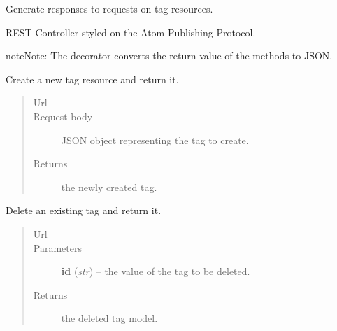 \documentclass[letterpaper,10pt,english]{sphinxmanual}
\begin{document}
\begin{fulllineitems}
\label{api:onlinelinguisticdatabase.controllers.tags.TagsController}
Generate responses to requests on tag resources.

REST Controller styled on the Atom Publishing Protocol.

\begin{notice}{note}{Note:}
The  decorator converts the return value of the methods to
JSON.
\end{notice}

\begin{fulllineitems}
\label{api:onlinelinguisticdatabase.controllers.tags.TagsController.create}
Create a new tag resource and return it.
\begin{quote}\begin{description}
\item[{Url }] \leavevmode
{}

\item[{Request body}] \leavevmode
JSON object representing the tag to create.

\item[{Returns}] \leavevmode
the newly created tag.

\end{description}\end{quote}

\end{fulllineitems}


\begin{fulllineitems}
\label{api:onlinelinguisticdatabase.controllers.tags.TagsController.delete}
Delete an existing tag and return it.
\begin{quote}\begin{description}
\item[{Url }] \leavevmode
{}

\item[{Parameters}] \leavevmode
\textbf{id} (\emph{str}) -- the  value of the tag to be deleted.

\item[{Returns}] \leavevmode
the deleted tag model.


\end{description}
\end{quote}
\end{fulllineitems}
\end{fulllineitems}
\end{document}

